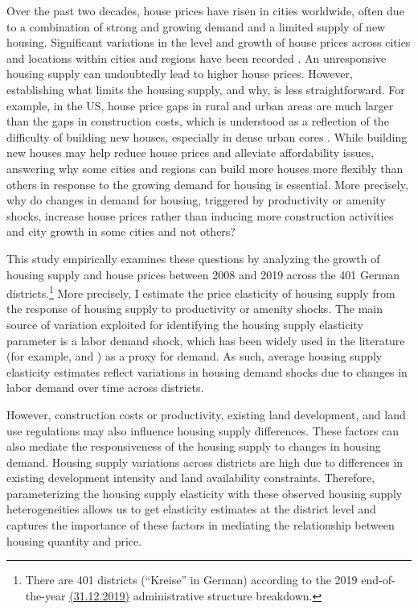 \documentclass[
  12pt,
]{article}
\begin{document}
Over the past two decades, house prices have risen in cities worldwide,
often due to a combination of strong and growing demand and a limited
supply of new housing. Significant variations in the level and growth of
house prices across cities and locations within cities and regions have
been recorded \citep{glaeser_2020, hilber_mense_2021}. An unresponsive
housing supply can undoubtedly lead to higher house prices. However,
establishing what limits the housing supply, and why, is less
straightforward. For example, in the US, house price gaps in rural and
urban areas are much larger than the gaps in construction costs, which
is understood as a reflection of the difficulty of building new houses,
especially in dense urban cores \citep{glaeser_2020}. While building new
houses may help reduce house prices and alleviate affordability issues,
answering why some cities and regions can build more houses more
flexibly than others in response to the growing demand for housing is
essential. More precisely, why do changes in demand for housing,
triggered by productivity or amenity shocks, increase house prices
rather than inducing more construction activities and city growth in
some cities and not others?

This study empirically examines these questions by analyzing the growth
of housing supply and house prices between 2008 and 2019 across the 401
German districts.\footnote{There are 401 districts (``Kreise'' in
  German) according to the 2019 end-of-the-year
  \href{https://www.destatis.de/DE/Themen/Laender-Regionen/Regionales/Gemeindeverzeichnis/Administrativ/Archiv/Verwaltungsgliederung/31122019_Jahr.html}{(31.12.2019)}
  administrative structure breakdown.} More precisely, I estimate the
price elasticity of housing supply from the response of housing supply
to productivity or amenity shocks. The main source of variation
exploited for identifying the housing supply elasticity parameter is a
\citet{bartik_1991} labor demand shock, which has been widely used in
the literature (for example, \citet{saiz_2010} and
\citet{baum-snow_han_2019}) as a proxy for demand. As such, average
housing supply elasticity estimates reflect variations in housing demand
shocks due to changes in labor demand over time across districts.

However, construction costs or productivity, existing land development,
and land use regulations may also influence housing supply differences.
These factors can also mediate the responsiveness of the housing supply
to changes in housing demand. Housing supply variations across districts
are high due to differences in existing development intensity and land
availability constraints. Therefore, parameterizing the housing supply
elasticity with these observed housing supply heterogeneities allows us
to get elasticity estimates at the district level and captures the
importance of these factors in mediating the relationship between
housing quantity and price.
\end{document}
